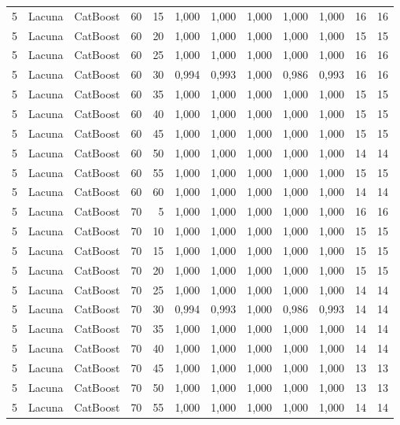 \begin{longtable}{@{}rllrrrrrrrrr@{}}
5 & Lacuna & CatBoost & 60 & 15 & 1,000 & 1,000 & 1,000 & 1,000 & 1,000 & 16 & 16 \\
5 & Lacuna & CatBoost & 60 & 20 & 1,000 & 1,000 & 1,000 & 1,000 & 1,000 & 15 & 15 \\
5 & Lacuna & CatBoost & 60 & 25 & 1,000 & 1,000 & 1,000 & 1,000 & 1,000 & 16 & 16 \\
5 & Lacuna & CatBoost & 60 & 30 & 0,994 & 0,993 & 1,000 & 0,986 & 0,993 & 16 & 16 \\
5 & Lacuna & CatBoost & 60 & 35 & 1,000 & 1,000 & 1,000 & 1,000 & 1,000 & 15 & 15 \\
5 & Lacuna & CatBoost & 60 & 40 & 1,000 & 1,000 & 1,000 & 1,000 & 1,000 & 15 & 15 \\
5 & Lacuna & CatBoost & 60 & 45 & 1,000 & 1,000 & 1,000 & 1,000 & 1,000 & 15 & 15 \\
5 & Lacuna & CatBoost & 60 & 50 & 1,000 & 1,000 & 1,000 & 1,000 & 1,000 & 14 & 14 \\
5 & Lacuna & CatBoost & 60 & 55 & 1,000 & 1,000 & 1,000 & 1,000 & 1,000 & 15 & 15 \\
5 & Lacuna & CatBoost & 60 & 60 & 1,000 & 1,000 & 1,000 & 1,000 & 1,000 & 14 & 14 \\
5 & Lacuna & CatBoost & 70 & 5 & 1,000 & 1,000 & 1,000 & 1,000 & 1,000 & 16 & 16 \\
5 & Lacuna & CatBoost & 70 & 10 & 1,000 & 1,000 & 1,000 & 1,000 & 1,000 & 15 & 15 \\
5 & Lacuna & CatBoost & 70 & 15 & 1,000 & 1,000 & 1,000 & 1,000 & 1,000 & 15 & 15 \\
5 & Lacuna & CatBoost & 70 & 20 & 1,000 & 1,000 & 1,000 & 1,000 & 1,000 & 15 & 15 \\
5 & Lacuna & CatBoost & 70 & 25 & 1,000 & 1,000 & 1,000 & 1,000 & 1,000 & 14 & 14 \\
5 & Lacuna & CatBoost & 70 & 30 & 0,994 & 0,993 & 1,000 & 0,986 & 0,993 & 14 & 14 \\
5 & Lacuna & CatBoost & 70 & 35 & 1,000 & 1,000 & 1,000 & 1,000 & 1,000 & 14 & 14 \\
5 & Lacuna & CatBoost & 70 & 40 & 1,000 & 1,000 & 1,000 & 1,000 & 1,000 & 14 & 14 \\
5 & Lacuna & CatBoost & 70 & 45 & 1,000 & 1,000 & 1,000 & 1,000 & 1,000 & 13 & 13 \\
5 & Lacuna & CatBoost & 70 & 50 & 1,000 & 1,000 & 1,000 & 1,000 & 1,000 & 13 & 13 \\
5 & Lacuna & CatBoost & 70 & 55 & 1,000 & 1,000 & 1,000 & 1,000 & 1,000 & 14 & 14 \\

\end{longtable}
